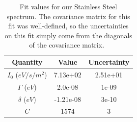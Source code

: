 \documentclass[reprint, nobibnotes, amssymb, amsmath, amsfonts, mathtools, mathrsfs, floatfix]{revtex4-1}
\begin{document}
      \begin{table}[h]
        \centering
        \begin{tabular}{|c|c|c|}
          \hline
          Quantity & Value & Uncertainty \\ \hline \hline
          $I_0$ ($eV/s/m^2$) & 7.13e+02 & 2.51e+01 \\ \hline \hline
          $\Gamma$ ($eV$) & 2.0e-08 & 1e-09 \\ \hline \hline
          $\delta$ ($eV$) & -1.21e-08 & 3e-10 \\ \hline \hline
          $C$ & 1574 & 3 \\ \hline
        \end{tabular}
        \caption{Fit values for our Stainless Steel spectrum.  The covariance matrix for this fit was well-defined, so the uncertainties on this fit simply come from the diagonals of the covariance matrix.~\label{tab:ss_fit_stats}}
      \end{table}
\end{document}
